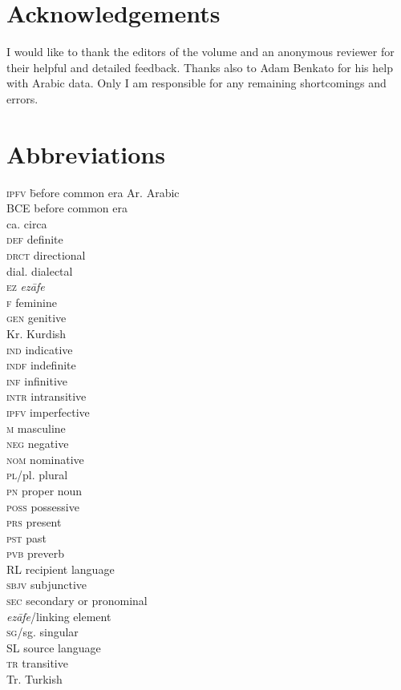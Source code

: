 \documentclass[output=paper]{langsci/langscibook}
\begin{document}
\section*{Acknowledgements}
I would like to thank the editors of the volume and an anonymous reviewer for their helpful and detailed feedback. Thanks also to Adam Benkato for his help with Arabic data. Only I am responsible for any remaining shortcomings and errors. 

\section*{Abbreviations}
\begin{multicols}{2}
\begin{tabbing}
\textsc{ipfv} \hspace{1em} \= before common era\kill
Ar.              \> Arabic\\
BCE             \> before common era\\
ca.             \> circa\\
\textsc{def}    \> definite \\
\textsc{drct}   \> directional\\
dial.           \> dialectal \\
\textsc{ez}     \> \textit{ezāfe} \\
\textsc{f}      \> feminine \\
\textsc{gen}    \> genitive\\
Kr.             \> Kurdish\\
\textsc{ind}    \> indicative \\
\textsc{indf}   \> indefinite \\
\textsc{inf}    \> infinitive\\
\textsc{intr}   \> intransitive\\
\textsc{ipfv}   \> imperfective \\
\textsc{m}      \> masculine \\
\textsc{neg}    \> negative\\
\textsc{nom}    \> nominative\\
\textsc{pl/}pl. \> plural \\
\textsc{pn}     \> proper noun\\
\textsc{poss}   \> possessive \\
\textsc{prs}    \> present \\
\textsc{pst}    \> past \\
\textsc{pvb}    \> preverb\\
RL              \> recipient language\\
\textsc{sbjv}   \> subjunctive \\
\textsc{sec}    \> secondary or pronominal \\ \> \textit{ezāfe}/linking element\\
\textsc{sg/}sg. \> singular\\
SL              \> source language\\
\textsc{tr}     \> transitive\\
Tr.             \> Turkish
\end{tabbing}
\end{multicols}


{\sloppy\printbibliography[heading=subbibliography,notkeyword=this]}
\end{document}
